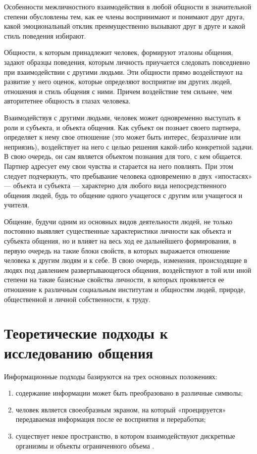 Особенности межличностного взаимодействия в любой общности в значительной степени обусловлены тем, как ее члены воспринимают и понимают друг друга, какой эмоциональный отклик преимущественно вызывают друг в друге и какой стиль поведения избирают.

Общности, к которым принадлежит человек, формируют эталоны общения, задают образцы поведения, которым личность приучается следовать повседневно при взаимодействии с другими людьми. Эти общности прямо воздействуют на развитие у него оценок, которые определяют восприятие им других людей, отношения и стиль общения с ними. Причем воздействие тем сильнее, чем авторитетнее общность в глазах человека.

Взаимодействуя с другими людьми, человек может одновременно выступать в роли и субъекта, и объекта общения. Как субъект он познает своего партнера, определяет к нему свое отношение (это может быть интерес, безразличие или неприязнь), воздействует на него с целью решения какой-либо конкретной задачи. В свою очередь, он сам является объектом познания для того, с кем общается. Партнер адресует ему свои чувства и старается на него повлиять. При этом следует подчеркнуть, что пребывание человека одновременно в двух «ипостасях» — объекта и субъекта — характерно для любого вида непосредственного общения людей, будь то общение одного учащегося с другим или учащегося и учителя.

Общение, будучи одним из основных видов деятельности людей, не только постоянно выявляет существенные характеристики личности как объекта и субъекта общения, но и влияет на весь ход ее дальнейшего формирования, в первую очередь на такие блоки свойств, в которых выражается отношение человека к другим людям и к себе. В свою очередь, изменения, происходящие в людях под давлением развертывающегося общения, воздействуют в той или иной степени на такие базисные свойства личности, в которых проявляется ее отношение к различным социальным институтам и общностям людей, природе, общественной и личной собственности, к труду.

\section{Теоретические подходы к исследованию общения}
Информационные подходы базируются на трех основных положениях: 
\begin{enumerate}
	\item содержание информации может быть преобразовано в различные символы;
	\item человек является своеобразным экраном, на который «проецируется» передаваемая информация после ее восприятия и переработки;
	\item существует некое пространство, в котором взаимодействуют дискретные организмы и объекты ограниченного объема \cite{9}.
\end{enumerate}

